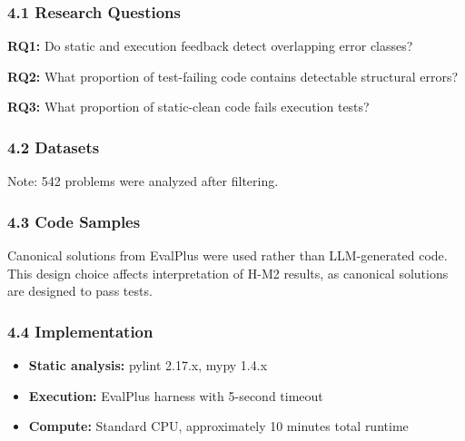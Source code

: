 
\subsubsection{4.1 Research Questions}

\textbf{RQ1:} Do static and execution feedback detect overlapping error classes?

\textbf{RQ2:} What proportion of test-failing code contains detectable structural errors?

\textbf{RQ3:} What proportion of static-clean code fails execution tests?

\subsubsection{4.2 Datasets}

\begin{table}[htbp]
\centering
{}
\end{table}

Note: 542 problems were analyzed after filtering.

\subsubsection{4.3 Code Samples}

Canonical solutions from EvalPlus were used rather than LLM-generated code. This design choice affects interpretation of H-M2 results, as canonical solutions are designed to pass tests.

\subsubsection{4.4 Implementation}

\begin{itemize}
\item \textbf{Static analysis:} pylint 2.17.x, mypy 1.4.x
\item \textbf{Execution:} EvalPlus harness with 5-second timeout
\item \textbf{Compute:} Standard CPU, approximately 10 minutes total runtime
\end{itemize}

